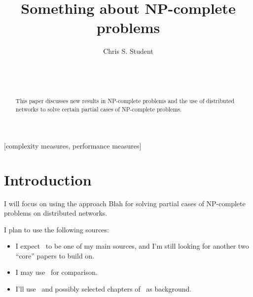 \documentclass{sig-alternate}
\begin{document}

\title{Something about NP-complete problems}


\author{
\alignauthor
Chris S. Student\\
	\\
	\\
	\\
}

\maketitle

\begin{abstract}
This paper discusses new results in NP-complete problems and the use of distributed
networks to solve certain partial cases of NP-complete problems.
\end{abstract}

[complexity measures, performance measures]



\section{Introduction}
I will focus on using the approach Blah for solving partial cases of
NP-complete problems on distributed networks.

I plan to use the following sources:
\begin{itemize}
\item I expect~\cite{OM:2008} to be one of my main sources, and I'm still looking for another two ``core'' papers to build on.
\item I may use~\cite{Brun:2008} for comparison. 
\item I'll use~\cite{Aaronson:2005, wiki:np-complete} and possibly selected chapters of~\cite{Garey:1979} as background. 
\end{itemize}
\end{document}
